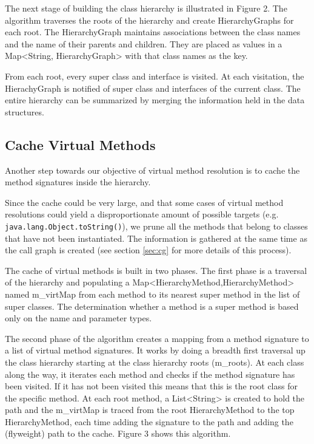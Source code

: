 \documentclass[preprint]{sigplanconf}
\begin{document}
The next stage of building the class hierarchy is illustrated in Figure 2. The algorithm traverses the roots of the hierarchy and create HierarchyGraphs for each root. The HierarchyGraph maintains associations between the class names and the name of their parents and children. They are placed as values in a Map<String, HierarchyGraph> with that class names as the key.

From each root, every super class and interface is visited. At each visitation, the HierachyGraph is notified of super class and interfaces of the current class. The entire hierarchy can be summarized by merging the information held in the data structures.

\subsection{Cache Virtual Methods}
\label{sec:methodcache}
Another step towards our objective of virtual method resolution is to cache the method signatures inside the hierarchy.

Since the cache could be very large, and that some cases of virtual method resolutions could yield a disproportionate amount of possible targets (e.g. {\tt java.lang.Object.toString()}), 
we prune all the methods that belong to classes that have not been instantiated. The information is gathered at the same time as the call graph is created (see section \ref{sec:cg} for more details of this process).

The cache of virtual methods is built in two phases. The first phase is a traversal of the hierarchy and populating a Map<HierarchyMethod,HierarchyMethod> named m\_virtMap from each method to its nearest super method in the list of super classes. The determination whether a method is a super method is based only on the name and parameter types.

The second phase of the algorithm creates a mapping from a method signature to a list of virtual method signatures. It works by doing a breadth first traversal up the class hierarchy starting at the class hierarchy roots (m\_roots). At each class along the way, it iterates each method and checks if the method signature has been visited. If it has not been visited this means that this is the root class for the specific method. At each root method, a List<String> is created to hold the path and the m\_virtMap is traced from the root HierarchyMethod to the top HierarchyMethod, each time adding the signature to the path and adding the (flyweight) path to the cache. Figure 3 shows this algorithm.
\end{document}
